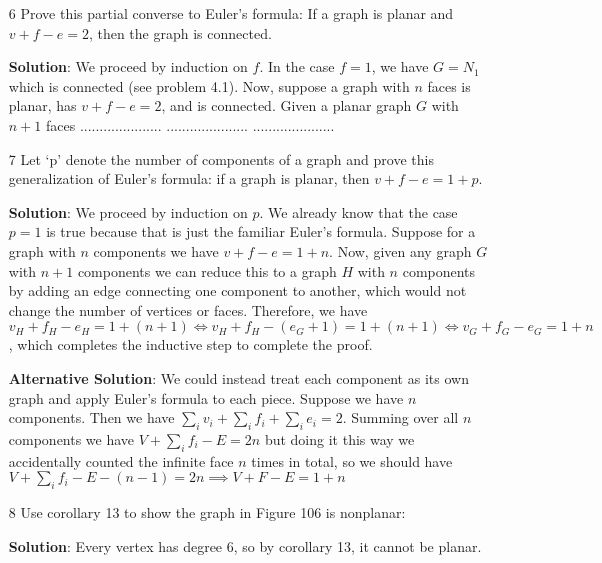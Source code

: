 \documentclass{article}
\begin{document}
\begin{enumerate}
	\item[6] Prove this partial converse to Euler's formula: If a graph is planar and $v + f - e = 2$, then the graph is connected.
	
	\textbf{Solution}: We proceed by induction on $f$. In the case $f = 1$, we have $G = N_1$ which is connected (see problem 4.1). Now, suppose a graph with $n$ faces is planar, has $v + f - e = 2$, and is connected. Given a planar graph $G$ with $n + 1$ faces
	.....................
	.....................
	.....................
	
	\item[7] Let `p' denote the number of components of a graph and prove this generalization of Euler's formula: if a graph is planar, then $v + f - e = 1 + p$.
	
	\textbf{Solution}: We proceed by induction on $p$. We already know that the case $p = 1$ is true because that is just the familiar Euler's formula. Suppose for a graph with $n$ components we have $v + f - e = 1 + n$. Now, given any graph $G$ with $n + 1$ components we can reduce this to a graph $H$ with $n$ components by adding an edge connecting one component to another, which would not change the number of vertices or faces. Therefore, we have $v_H + f_H - e_H = 1 + (n + 1) \iff v_H + f_H - (e_G + 1) = 1 + (n + 1) \iff v_G + f_G - e_G = 1 + n$, which completes the inductive step to complete the proof.
	
	\textbf{Alternative Solution}: We could instead treat each component as its own graph and apply Euler's formula to each piece. Suppose we have $n$ components. Then we have $\sum_{i}{v_i} + \sum_{i}{f_i} + \sum_{i}{e_i} = 2$. Summing over all $n$ components we have $V + \sum_{i}{f_i} - E = 2n$ but doing it this way we accidentally counted the infinite face $n$ times in total, so we should have $V + \sum_{i}{f_i} - E - (n - 1) = 2n \implies V + F - E = 1 + n$

	\item[8] Use corollary 13 to show the graph in Figure 106 is nonplanar:
	
	\textbf{Solution}: Every vertex has degree 6, so by corollary 13, it cannot be planar.
\end{enumerate}
\end{document}
